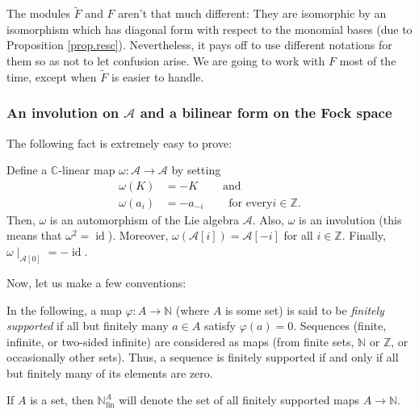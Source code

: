 \documentclass[etingof-lie.tex]{subfiles}
\begin{document}
The modules $\widetilde{F}$ and $F$ aren't that much different: They are
isomorphic by an isomorphism which has diagonal form with respect to the
monomial bases (due to Proposition \ref{prop.resc}). Nevertheless, it pays off
to use different notations for them so as not to let confusion arise. We are
going to work with $F$ most of the time, except when $\widetilde{F}$ is easier
to handle.

\subsubsection{An involution on \texorpdfstring{$\mathcal{A}$}{A} and a
bilinear form on the Fock space}

The following fact is extremely easy to prove:

\begin{proposition}
\label{prop.A.omega}Define a $\mathbb{C}$-linear map $\omega:\mathcal{A}%
\rightarrow\mathcal{A}$ by setting
\begin{align*}
\omega\left(  K\right)   &  =-K\ \ \ \ \ \ \ \ \ \ \text{and}\\
\omega\left(  a_{i}\right)   &  =-a_{-i}\ \ \ \ \ \ \ \ \ \ \text{for every
}i\in\mathbb{Z}.
\end{align*}
Then, $\omega$ is an automorphism of the Lie algebra $\mathcal{A}$. Also,
$\omega$ is an involution (this means that $\omega^{2}=\operatorname*{id}$).
Moreover, $\omega\left(  \mathcal{A}\left[  i\right]  \right)  =\mathcal{A}%
\left[  -i\right]  $ for all $i\in\mathbb{Z}$. Finally, $\omega\mid
_{\mathcal{A}\left[  0\right]  }=-\operatorname*{id}$.
\end{proposition}

Now, let us make a few conventions:

\begin{Convention}
\label{conv.fin}In the following, a map $\varphi:A\rightarrow\mathbb{N}$
(where $A$ is some set) is said to be \textit{finitely supported} if all but
finitely many $a\in A$ satisfy $\varphi\left(  a\right)  =0$. Sequences
(finite, infinite, or two-sided infinite) are considered as maps (from finite
sets, $\mathbb{N}$ or $\mathbb{Z}$, or occasionally other sets). Thus, a
sequence is finitely supported if and only if all but finitely many of its
elements are zero.

If $A$ is a set, then $\mathbb{N}_{\operatorname*{fin}}^{A}$ will denote the
set of all finitely supported maps $A\rightarrow\mathbb{N}$.
\end{Convention}
\end{document}
